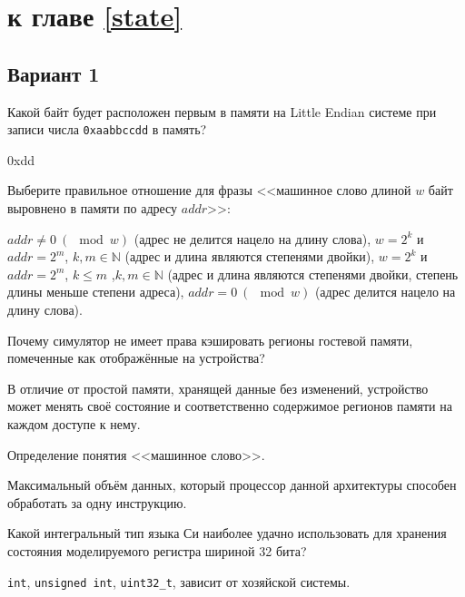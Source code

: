 \section{\Questions к главе \ref{state}} %

\subsection*{Вариант 1}

\begin{questions}

\question[3] Какой байт будет расположен первым в памяти на Little Endian системе при записи числа \texttt{0xaabbccdd} в память?
\begin{solution}[1cm]
0xdd
\end{solution}

\question[3] Выберите правильное отношение для фразы <<машинное слово длиной $w$ байт выровнено в памяти по адресу $addr$>>:
\begin{choices}
    \choice $addr \neq 0\ (\mod w)$ (адрес не делится нацело на длину слова),
    \choice $w = 2^k$ и $addr = 2^m$, $k,m \in \mathbb{N}$ (адрес и длина являются степенями двойки),
    \choice $w = 2^k$ и $addr = 2^m$, $k \leq m $ ,$k,m \in \mathbb{N}$ (адрес и длина являются степенями двойки, степень длины меньше степени адреса),
    \correctchoice $addr = 0\ (\mod w)$ (адрес делится нацело на длину слова).
\end{choices}

\question[3] Почему симулятор не имеет права кэшировать регионы гостевой памяти, помеченные как отображённые на устройства?
\begin{solution}[2cm]
В отличие от простой памяти, хранящей данные без изменений, устройство может менять своё состояние и соответственно содержимое регионов памяти на каждом доступе к нему.
\end{solution}

\question[3] Определение понятия <<машинное слово>>.
\begin{solution}[1cm]
Максимальный объём данных, который процессор данной архитектуры способен обработать за одну инструкцию. 
\end{solution}

\question[3] Какой интегральный тип языка Си наиболее удачно использовать для хранения состояния моделируемого регистра шириной 32 бита?
\begin{choices}
    \choice \texttt{int},
    \choice \texttt{unsigned int},
    \correctchoice \texttt{uint32_t},
    \choice зависит от хозяйской системы.
\end{choices}

\end{questions}

